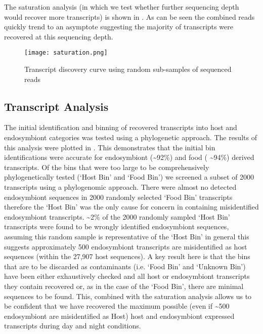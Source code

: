 \documentclass[a4paper,11pt]{article}
\begin{document}
The saturation analysis (in which we test whether further sequencing depth would recover more transcripts) is shown in .  
As can be seen the combined reads quickly trend to an asymptote suggesting the majority of transcripts were recovered at this sequencing depth.

\begin{figure}
  \begin{center}
    \texttt{[image: saturation.png]}
    \caption{Transcript discovery curve using random sub-samples of sequenced reads}
      \label{fig:saturation}
  \end{center}
\end{figure}


\subsection{Transcript Analysis}
The initial identification and binning of recovered transcripts into host and endosymbiont categories was tested using a phylogenetic approach. 
The results of this analysis were plotted in .  
This demonstrates that the initial bin identifications were accurate for endosymbiont (\textasciitilde92\%) and food ( \textasciitilde94\%) derived transcripts.  
Of the bins that were too large to be comprehensively phylogenetically tested (`Host Bin' and `Food Bin') we screened a subset of 2000 transcripts using a phylogenomic approach. 
There were almost no detected endosymbiont sequences in 2000 randomly selected `Food Bin' transcripts therefore the `Host Bin' was the only cause for concern in containing misidentified endosymbiont transcripts.  
\textasciitilde 2\% of the 2000 randomly sampled `Host Bin' transcripts were found to be wrongly identified endosymbiont sequences, assuming this random sample is representative of the `Host Bin' in general this suggests approximately 500 endosymbiont transcripts are misidentified as host sequences (within the 27,907 host sequences).  
A key result here is that the bins that are to be discarded as contaminants (i.e. `Food Bin' and `Unknown Bin') have been either exhaustively checked and all host or endosymbiont transcripts they contain recovered or, as in the case of the `Food Bin', there are minimal sequences to be found.  
This, combined with the saturation analysis allows us to be confident that we have recovered the maximum possible (even if \textasciitilde 500 endosymbiont are misidentified as Host) host and endosymbiont expressed transcripts during day and night conditions.
\end{document}
